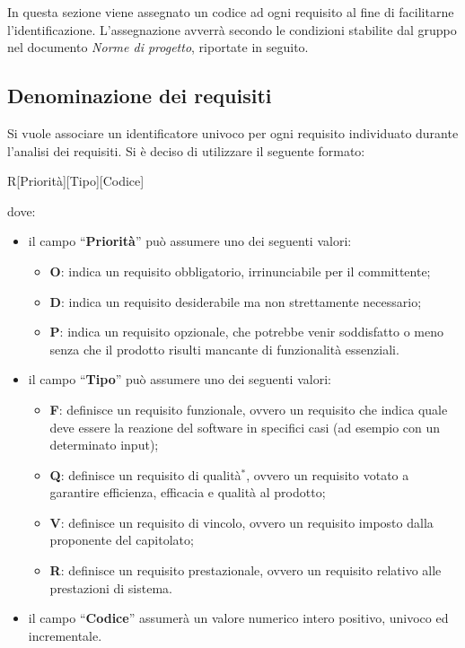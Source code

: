 In questa sezione viene assegnato un codice ad ogni requisito al fine di facilitarne l'identificazione. L'assegnazione avverrà secondo le condizioni stabilite dal gruppo nel documento \textit{Norme di progetto}, riportate in seguito. 
\subsection{Denominazione dei requisiti}
Si vuole associare un identificatore univoco per ogni requisito individuato durante l'analisi dei requisiti. Si \`e deciso di utilizzare il seguente formato:
  \begin{center}
    R[Priorità][Tipo][Codice]
	\end{center}
dove:
	\begin{itemize}
	\item il campo “\textbf{Priorità}” può assumere uno dei seguenti 	valori:
		\begin{itemize}
  		\item \textbf{O}: indica un requisito obbligatorio, irrinunciabile per il committente;
		\item \textbf{D}: indica un requisito desiderabile ma non strettamente necessario;
		\item \textbf{P}: indica un requisito opzionale, che potrebbe venir soddisfatto o meno senza che il prodotto risulti mancante di funzionalità essenziali.
		\end{itemize}
	\item il campo “\textbf{Tipo}” può assumere uno dei seguenti valori:
		\begin{itemize}
  		\item \textbf{F}: definisce un requisito funzionale, ovvero un requisito che indica quale deve essere la reazione del software in specifici casi (ad esempio con  un determinato input);
		\item \textbf{Q}: definisce un requisito di qualità$^*$, ovvero un requisito votato a garantire efficienza, efficacia e qualità al prodotto;
		\item \textbf{V}: definisce un requisito di vincolo, ovvero un requisito imposto dalla proponente del capitolato;
		\item \textbf{R}: definisce un requisito prestazionale, ovvero un requisito relativo alle prestazioni di sistema.
		\end{itemize}
	\item il campo “\textbf{Codice}” assumerà un valore numerico intero positivo, univoco ed incrementale.
	\end{itemize}
\newpage
